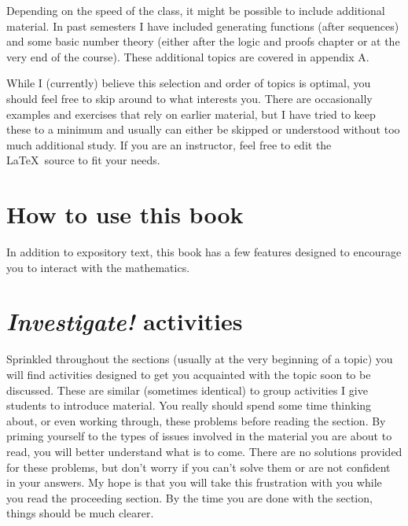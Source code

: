 \documentclass[10pt,]{book}
\theoremstyle{plain}
\theoremstyle{definition}
\theoremstyle{definition}
\theoremstyle{definition}
\begin{document}
Depending on the speed of the class, it might be possible to include additional material. In past semesters I have included generating functions (after sequences) and some basic number theory (either after the logic and proofs chapter or at the very end of the course). These additional topics are covered in appendix A.
%
\par

While I (currently) believe this selection and order of topics is optimal, you should feel free to skip around to what interests you. There are occasionally examples and exercises that rely on earlier material, but I have tried to keep these to a minimum and usually can either be skipped or understood without too much additional study. If you are an instructor, feel free to edit the \LaTeX{}~source to fit your needs.
%
\chapter*{How to use this book}\label{preface-2}
\typeout{************************************************}
\typeout{************************************************}

  In addition to expository text, this book has a few features designed to encourage you to interact with the mathematics.
\chapter*{\emph{Investigate!} activities}\label{preface-3}

  Sprinkled throughout the sections (usually at the very beginning of a topic) you will find activities designed to get you acquainted with the topic soon to be discussed. These are similar (sometimes identical) to group activities I give students to introduce material. You really should spend some time thinking about, or even working through, these problems before reading the section. By priming yourself to the types of issues involved in the material you are about to read, you will better understand what is to come. There are no solutions provided for these problems, but don't worry if you can't solve them or are not confident in your answers. My hope is that you will take this frustration with you while you read the proceeding section. By the time you are done with the section, things should be much clearer.
\end{document}
